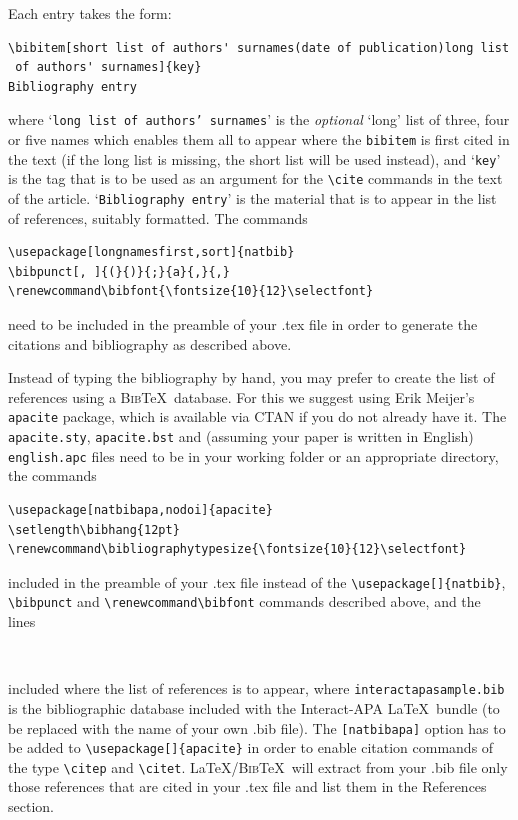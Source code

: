 \documentclass[]{interact}
\renewcommand\bibfont{\fontsize{10}{12}\selectfont}%
\theoremstyle{plain}%
\theoremstyle{definition}
\theoremstyle{remark}
\begin{document}
\bigskip
\noindent Each entry takes the form:
\begin{verbatim}
\bibitem[short list of authors' surnames(date of publication)long list
 of authors' surnames]{key}
Bibliography entry
\end{verbatim}
where `\texttt{long list of authors' surnames}' is the \emph{optional} `long' list of three, four or five names which enables them all to appear where the \verb"bibitem" is first cited in the text (if the long list is missing, the short list will be used instead), and `\texttt{key}' is the tag that is to be used as an argument for the \verb"\cite" commands in the text of the article. `\texttt{Bibliography entry}' is the material that is to appear in the list of references, suitably formatted. The commands
\begin{verbatim}
\usepackage[longnamesfirst,sort]{natbib}
\bibpunct[, ]{(}{)}{;}{a}{,}{,}
\renewcommand\bibfont{\fontsize{10}{12}\selectfont}
\end{verbatim}
need to be included in the preamble of your .tex file in order to generate the citations and bibliography as described above.

Instead of typing the bibliography by hand, you may prefer to create the list of references using a \textsc{Bib}\TeX\ database. For this we suggest using Erik Meijer's \texttt{apacite} package, which is available via CTAN if you do not already have it. The \verb"apacite.sty", \verb"apacite.bst" and (assuming your paper is written in English) \verb"english.apc" files need to be in your working folder or an appropriate directory, the commands
\begin{verbatim}
\usepackage[natbibapa,nodoi]{apacite}
\setlength\bibhang{12pt}
\renewcommand\bibliographytypesize{\fontsize{10}{12}\selectfont}
\end{verbatim}
included in the preamble of your .tex file instead of the \verb"\usepackage[]{natbib}", \verb"\bibpunct" and \verb"\renewcommand\bibfont" commands described above, and the lines
\begin{verbatim}


\end{verbatim}
included where the list of references is to appear, where \texttt{interactapasample.bib} is the bibliographic database included with the \textsf{Interact}-APA \LaTeX\ bundle (to be replaced with the name of your own .bib file). The \verb"[natbibapa]" option has to be added to \verb"\usepackage[]{apacite}" in order to enable citation commands of the type \verb"\citep" and \verb"\citet". \LaTeX/\textsc{Bib}\TeX\ will extract from your .bib file only those references that are cited in your .tex file and list them in the References section.
\end{document}
